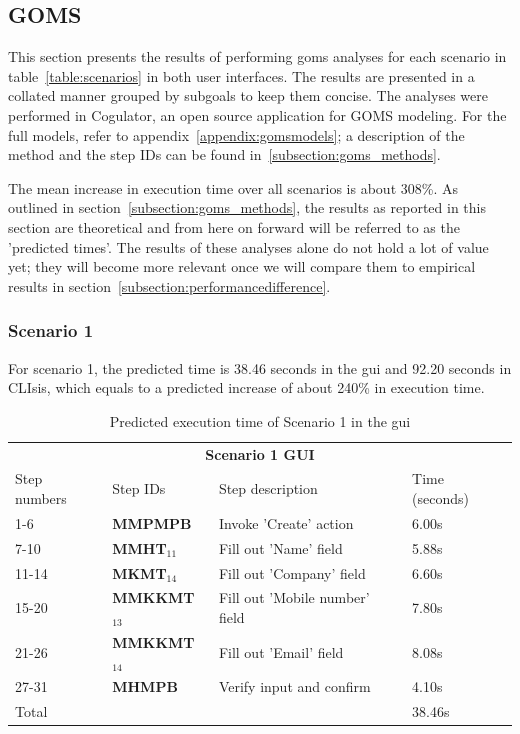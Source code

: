 \subsection{GOMS}
\label{subsection:goms_evaluation}
This section presents the results of performing \acrshort{goms} analyses for each scenario in table~\ref{table:scenarios} in both user interfaces. The results are presented in a collated manner grouped by subgoals to keep them concise. The analyses were performed in Cogulator\cite{Cogul87:online}, an open source application for GOMS modeling. For the full models, refer to appendix~\ref{appendix:gomsmodels}; a description of the method and the step IDs can be found in~\ref{subsection:goms_methods}.

The mean increase in execution time over all scenarios is about 308\%. As outlined in section~\ref{subsection:goms_methods}, the results as reported in this section are theoretical and from here on forward will be referred to as the 'predicted times'. The results of these analyses alone do not hold a lot of value yet; they will become more relevant once we will compare them to empirical results in section~\ref{subsection:performancedifference}.

\subsubsection{Scenario 1}
For scenario 1, the predicted time is 38.46 seconds in the \acrshort{gui} and 92.20 seconds in CLIsis, which equals to a predicted increase of about 240\% in execution time.

\begin{table}[H]
	\center
	
	\begin{tabular}{llll}
		\toprule
		\multicolumn{4}{c}{\textbf{Scenario 1 GUI}} \\
		\addlinespace[0.5em]
		Step numbers & Step IDs & Step description & Time (seconds) \\
		\midrule
		1-6 		& \textbf{MMPMPB} 				& Invoke 'Create' action 			& 6.00s \\
		7-10		& \textbf{MMHT$_{11}$} 		& Fill out 'Name' field		 		& 5.88s \\
		11-14	& \textbf{MKMT$_{14}$}		& Fill out 'Company' field			& 6.60s \\
		15-20	& \textbf{MMKKMT$_{13}$} 	& Fill out 'Mobile number' field	& 7.80s \\
		21-26	& \textbf{MMKKMT$_{14}$}	& Fill out 'Email' field				& 8.08s \\
		27-31	& \textbf{MHMPB}					& Verify input and confirm		& 4.10s \\
		\midrule
		\multicolumn{3}{l}{Total}																	& 38.46s\\
		\bottomrule
	\end{tabular}
	
	\caption{Predicted execution time of Scenario 1 in the \acrshort{gui}}
	\label{table:gomsscenario1gui}
\end{table}

